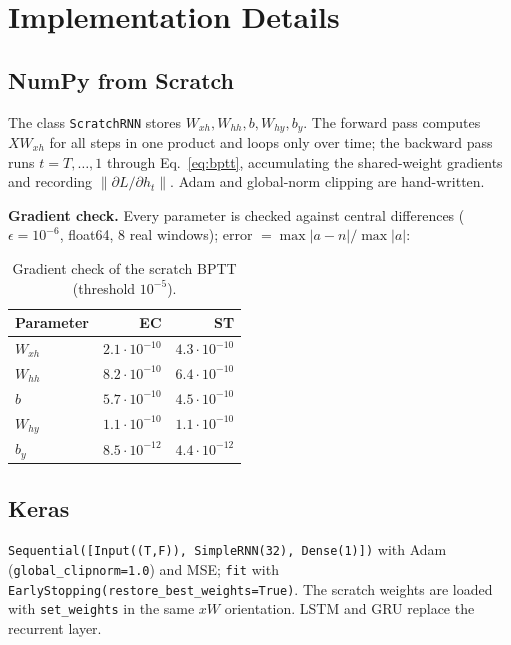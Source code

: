 \documentclass[11pt, a4paper]{article}
\begin{document}
\section{Implementation Details}

\subsection{NumPy from Scratch}
The class \texttt{ScratchRNN} stores $W_{xh},W_{hh},b,W_{hy},b_y$. The forward pass computes $XW_{xh}$ for all steps in one product and loops only over time; the backward pass
runs $t=T,\dots,1$ through Eq.~\eqref{eq:bptt}, accumulating the shared-weight gradients and recording $\lVert\partial L/\partial h_t\rVert$. Adam and global-norm clipping are hand-written.

\textbf{Gradient check.} Every parameter is checked against central differences ($\epsilon=10^{-6}$, float64, 8 real windows); error $=\max|a-n|/\max|a|$:

\begin{table}[H]
\centering
\caption{Gradient check of the scratch BPTT (threshold $10^{-5}$).}
\small
\begin{tabular}{lrr}
\toprule
Parameter & EC & ST \\
\midrule
$W_{xh}$ & $2.1\cdot10^{-10}$ & $4.3\cdot10^{-10}$ \\
$W_{hh}$ & $8.2\cdot10^{-10}$ & $6.4\cdot10^{-10}$ \\
$b$ & $5.7\cdot10^{-10}$ & $4.5\cdot10^{-10}$ \\
$W_{hy}$ & $1.1\cdot10^{-10}$ & $1.1\cdot10^{-10}$ \\
$b_y$ & $8.5\cdot10^{-12}$ & $4.4\cdot10^{-12}$ \\
\bottomrule
\end{tabular}
\end{table}

\subsection{Keras}
\texttt{Sequential([Input((T,F)), SimpleRNN(32), Dense(1)])} with Adam (\texttt{global\_clipnorm=1.0}) and MSE; \texttt{fit} with \texttt{EarlyStopping(restore\_best\_weights=True)}.
The scratch weights are loaded with \texttt{set\_weights} in the same $xW$ orientation. LSTM and GRU replace the recurrent layer.
\end{document}
